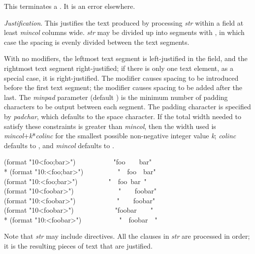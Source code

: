 \begin{flushdesc}
\item[\cd{{\Xtilde}{\Xrbrace}}]
This terminates a \cd{{\Xtilde}{\Xlbrace}}.  It is an error elsewhere.

\item[\cd{{\Xtilde}\emph{mincol},\emph{colinc},\emph{minpad},\emph{padchar}<\emph{str}{\Xtilde}>}]
\emph{Justification}.
This justifies the text produced by processing \emph{str}
within a field at least \emph{mincol} columns wide.  \emph{str}
may be divided up into segments with \cd{{\Xtilde};}, in which case the
spacing is evenly divided between the text segments.

With no modifiers, the leftmost text segment is left-justified in the
field, and the rightmost text segment right-justified;  if there is
only one text element, as a special case, it is right-justified.
The \cd{:} modifier causes
spacing to be introduced before the first text segment;  the \cd{{\Xatsign}}
modifier causes spacing to be added after the last.
The \emph{minpad} parameter (default ) is the minimum number of
padding characters to be output between each segment.
The padding character is specified by \emph{padchar},
which defaults to the space character.
If the total width needed to satisfy these constraints is greater
than \emph{mincol}, then the width used is \emph{mincol}+\emph{k}*\emph{colinc}
for the smallest possible non-negative integer value \emph{k};
\emph{colinc} defaults to , and \emph{mincol} defaults to .

\begin{lisp}
(format {\false} "{\Xtilde}10<foo{\Xtilde};bar{\Xtilde}>")~~~~~~~~~~\EV\  "foo~~~~bar" \\*
(format {\false} "{\Xtilde}10:<foo{\Xtilde};bar{\Xtilde}>")~~~~~~~~~\EV\  "~~foo~~bar" \\
(format {\false} "{\Xtilde}10:{\Xatsign}<foo{\Xtilde};bar{\Xtilde}>")~~~~~~~~\EV\  "~~foo~bar~" \\
(format {\false} "{\Xtilde}10<foobar{\Xtilde}>")~~~~~~~~~~~~\EV\  "~~~~foobar" \\
(format {\false} "{\Xtilde}10:<foobar{\Xtilde}>")~~~~~~~~~~~\EV\  "~~~~foobar" \\
(format {\false} "{\Xtilde}10{\Xatsign}<foobar{\Xtilde}>")~~~~~~~~~~~\EV\  "foobar~~~~" \\*
(format {\false} "{\Xtilde}10:{\Xatsign}<foobar{\Xtilde}>")~~~~~~~~~~\EV\  "~~foobar~~"
\end{lisp}

Note that \emph{str} may include  directives.
All the clauses in \emph{str} are processed in order;
it is the resulting pieces of text that are justified.


\end{flushdesc}
